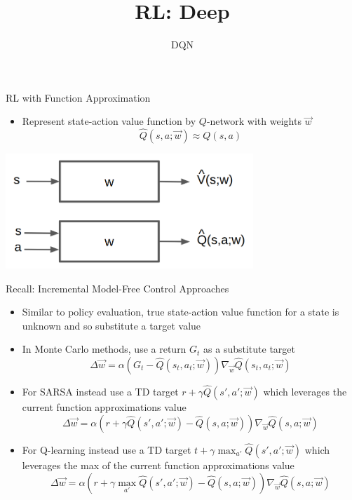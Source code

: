 


\title[Reinforcement Learning: Deep Reinforcement Learning]{RL: Deep}
\subtitle{DQN}




	
	\maketitle

\begin{frame}[c]{RL with Function Approximation}
	
\begin{itemize}
	\item Represent state-action value function by $Q$-network with weights $\vec{w}$
	$$\hat{Q}(s,a;\vec{w}) \approx Q(s,a)$$
\end{itemize}

\centering
\includegraphics[width=0.7\textwidth]{../w05_function_approx/images/vfa.png}


\end{frame}
\begin{frame}[c]{Recall: Incremental Model-Free Control Approaches}
	
\begin{itemize}
	\item Similar to policy evaluation, true state-action value function for a state is unknown and so substitute a target value
	\item In Monte Carlo methods, use a return $G_t$ as a substitute target
	$$\Delta \vec{w} = \alpha(G_t - \hat{Q}(s_t,a_t; \vec{w})) \nabla_{\vec{w}} \hat{Q}(s_t, a_t; \vec{w}) $$
	\item For SARSA instead use a TD target $r+ \gamma \hat{Q}(s', a'; \vec{w})$ which leverages the current function approximations value
	$$\Delta \vec{w} = \alpha (r + \gamma \hat{Q}(s',a';\vec{w}) - \hat{Q}(s,a;\vec{w})) \nabla_{\vec{w}}\hat{Q}(s,a;\vec{w}) $$
	\item For Q-learning instead use a TD target $t + \gamma \max_{a'} \hat{Q}(s',a';\vec{w})$ which leverages the max of the current function approximations value
	$$\Delta \vec{w} = \alpha (r + \gamma \max_{a'} \hat{Q}(s',a';\vec{w}) - \hat{Q}(s,a;\vec{w})) \nabla_{\vec{w}}\hat{Q}(s,a;\vec{w}) $$
\end{itemize}
	
\end{frame}
